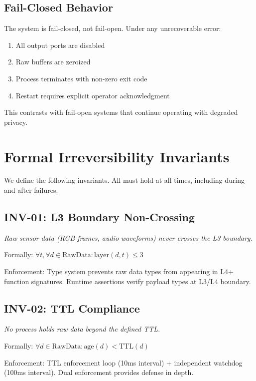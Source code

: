 \documentclass[conference]{IEEEtran}
\begin{document}
\subsection{Fail-Closed Behavior}
The system is fail-closed, not fail-open. Under any unrecoverable error:
\begin{enumerate}
    \item All output ports are disabled
    \item Raw buffers are zeroized
    \item Process terminates with non-zero exit code
    \item Restart requires explicit operator acknowledgment
\end{enumerate}

This contrasts with fail-open systems that continue operating with degraded privacy.

\section{Formal Irreversibility Invariants}

We define the following invariants. All must hold at all times, including during and after failures.

\subsection{INV-01: L3 Boundary Non-Crossing}
\textit{Raw sensor data (RGB frames, audio waveforms) never crosses the L3 boundary.}

Formally: $\forall t, \forall d \in \text{RawData}: \text{layer}(d, t) \leq 3$

Enforcement: Type system prevents raw data types from appearing in L4+ function signatures. Runtime assertions verify payload types at L3/L4 boundary.

\subsection{INV-02: TTL Compliance}
\textit{No process holds raw data beyond the defined TTL.}

Formally: $\forall d \in \text{RawData}: \text{age}(d) < \text{TTL}(d)$

Enforcement: TTL enforcement loop (10ms interval) + independent watchdog (100ms interval). Dual enforcement provides defense in depth.
\end{document}
